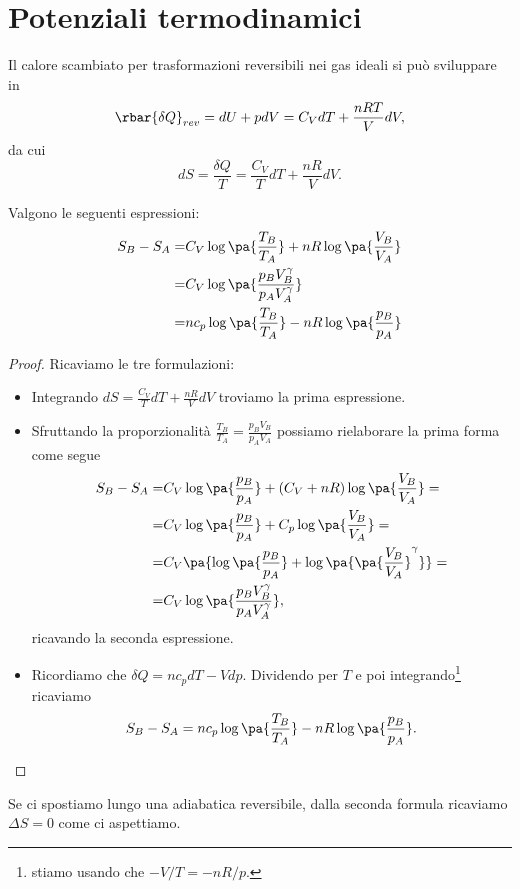 \section{Potenziali termodinamici}
Il calore scambiato per trasformazioni reversibili nei gas ideali si pu\`o sviluppare in
\[\rbar{\delta Q}_{rev}=dU+pdV=C_VdT+\frac{nRT}VdV,\]
da cui
\[dS=\frac{\delta Q}T=\frac{C_V}TdT+\frac{nR}VdV.\]
\begin{proposition}\label{EntropiaGasIdeali}
Valgono le seguenti espressioni:
\begin{align*}
S_B-S_A=&C_V\log\pa{\frac{T_B}{T_A}}+nR\log\pa{\frac{V_B}{V_A}}\\
=&C_V\log\pa{\frac{p_BV_B^\gamma}{p_AV_A^\gamma}}\\
=&nc_p\log\pa{\frac{T_B}{T_A}}-nR\log\pa{\frac{p_B}{p_A}}
\end{align*}
\end{proposition}
\begin{proof}
Ricaviamo le tre formulazioni:
\begin{itemize}
\item Integrando $dS=\frac{C_V}TdT+\frac{nR}VdV$ troviamo la prima espressione.
\item Sfruttando la proporzionalit\`a $\displaystyle \frac{T_B}{T_A}=\frac{p_BV_B}{p_AV_A}$ possiamo rielaborare la prima forma come segue
\begin{align*}
S_B-S_A=&C_V\log\pa{\frac{p_B}{p_A}}+(C_V+nR)\log\pa{\frac{V_B}{V_A}}=\\
=&C_V\log\pa{\frac{p_B}{p_A}}+C_p\log\pa{\frac{V_B}{V_A}}=\\
=&C_V\pa{\log\pa{\frac{p_B}{p_A}}+\log\pa{\pa{\frac{V_B}{V_A}}^\gamma}}=\\
=&C_V\log\pa{\frac{p_BV_B^\gamma}{p_AV_A^\gamma}},
\end{align*}
ricavando la seconda espressione.
\item Ricordiamo che $\delta Q=nc_p dT-Vdp$. Dividendo per $T$ e poi integrando\footnote{stiamo usando che $-V/T=-nR/p$.} ricaviamo
\[S_B-S_A=nc_p\log\pa{\frac{T_B}{T_A}}-nR\log\pa{\frac{p_B}{p_A}}.\]
\end{itemize}
\end{proof}


\begin{remark}
Se ci spostiamo lungo una adiabatica reversibile, dalla seconda formula ricaviamo $\Delta S=0$ come ci aspettiamo.
\end{remark}

